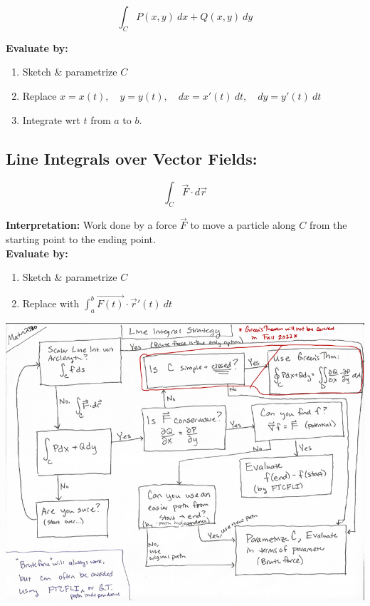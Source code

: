 \[
 \int_C P(x,y)\ dx +  Q(x,y)\ dy
\]

\textbf{Evaluate by:}
\begin{enumerate}[1.]
\item Sketch \& parametrize \(C\)
\item Replace \(x=x(t), \quad y=y(t), \quad dx = x'(t)\ dt, \quad dy=y'(t)\ dt\)
\item Integrate wrt \(t\) from \(a\) to \(b\).


\end{enumerate}

\vspace*{.1in}%

\subsection*{Line Integrals over Vector Fields:}


\[
 \int_C \vec{F}\cdot d\vec{r}
\]

\textbf{Interpretation:} Work done by a force \(\vec{F}\) to move a particle along \(C\) from the starting point to the ending point.\\

\textbf{Evaluate by:}
\begin{enumerate}[1.]
\item Sketch \& parametrize \(C\)
\item Replace with \( \int_a^b \vec{F(t)}\cdot \vec{r}'(t)\ dt\)


\end{enumerate}



\pagebreak

\includegraphics[angle=90,width=\textwidth]{22FQ-2330_Ch13_Flowchart.png}

